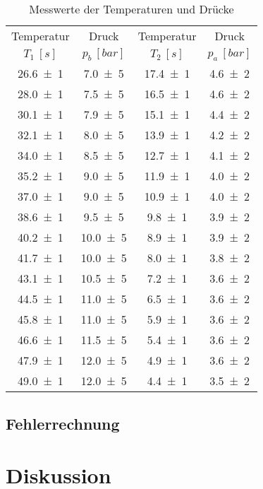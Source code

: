 		\begin{table}[!h]
			\centering
			\begin{tabular}{|C|C|C|C|}
				\hline
				Temperatur       & Druck              & Temperatur       & Druck              \\
				$T_{1}~[\si{s}]$ & $p_{b}~[\si{bar}]$ & $T_{2}~[\si{s}]$ & $p_{a}~[\si{bar}]$ \\ \hline\hline
				\num{26,6(1)}    & \num{7,0(5)}       & \num{17,4(1)}    & \num{4,6(2)}       \\
				\num{28,0(1)}    & \num{7,5(5)}       & \num{16,5(1)}    & \num{4,6(2)}       \\
				\num{30,1(1)}    & \num{7,9(5)}       & \num{15,1(1)}    & \num{4,4(2)}       \\
				\num{32,1(1)}    & \num{8,0(5)}       & \num{13,9(1)}    & \num{4,2(2)}       \\
				\num{34,0(1)}    & \num{8,5(5)}       & \num{12,7(1)}    & \num{4,1(2)}       \\
				\num{35,2(1)}    & \num{9,0(5)}       & \num{11,9(1)}    & \num{4,0(2)}       \\
				\num{37,0(1)}    & \num{9,0(5)}       & \num{10,9(1)}    & \num{4,0(2)}       \\
				\num{38,6(1)}    & \num{9,5(5)}       & \num{9,8(1)}     & \num{3,9(2)}       \\
				\num{40,2(1)}    & \num{10,0(5)}      & \num{8,9(1)}     & \num{3,9(2)}       \\
				\num{41,7(1)}    & \num{10,0(5)}      & \num{8,0(1)}     & \num{3,8(2)}       \\
				\num{43,1(1)}    & \num{10,5(5)}      & \num{7,2(1)}     & \num{3,6(2)}       \\
				\num{44,5(1)}    & \num{11,0(5)}      & \num{6,5(1)}     & \num{3,6(2)}       \\
				\num{45,8(1)}    & \num{11,0(5)}      & \num{5,9(1)}     & \num{3,6(2)}       \\
				\num{46,6(1)}    & \num{11,5(5)}      & \num{5,4(1)}     & \num{3,6(2)}       \\
				\num{47,9(1)}    & \num{12,0(5)}      & \num{4,9(1)}     & \num{3,6(2)}       \\
				\num{49,0(1)}    & \num{12,0(5)}      & \num{4,4(1)}     & \num{3,5(2)}       \\ 
				\hline
			\end{tabular}
			\caption{Messwerte der Temperaturen und Drücke}
			\label{tab:Daten}
		\end{table}
	   
	
		\subsection{Fehlerrechnung}\label{Fehlerrechnung}
	
	
	
	\section{Diskussion}\label{Diskussion}
\newpage
\printbibliography

